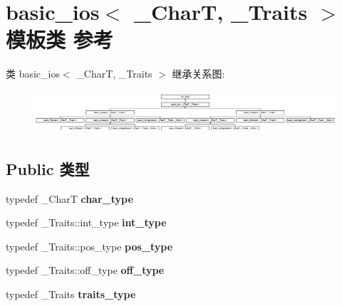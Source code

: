 \hypertarget{classbasic__ios}{}\section{basic\+\_\+ios$<$ \+\_\+\+CharT, \+\_\+\+Traits $>$ 模板类 参考}
\label{classbasic__ios}
类 basic\+\_\+ios$<$ \+\_\+\+CharT, \+\_\+\+Traits $>$ 继承关系图\+:\begin{figure}[H]
\begin{center}
\leavevmode
\includegraphics[height=1.609195cm]{classbasic__ios}
\end{center}
\end{figure}
\subsection*{Public 类型}
\begin{DoxyCompactItemize}
\item 
\mbox{\label{classbasic__ios_a00c2375a3ee154886d040383684bc5f1}} 
typedef \+\_\+\+CharT {\bfseries char\+\_\+type}
\item 
\mbox{\label{classbasic__ios_abfb1eed1ab102dee14f63458b8bdfe9e}} 
typedef \+\_\+\+Traits\+::int\+\_\+type {\bfseries int\+\_\+type}
\item 
\mbox{\label{classbasic__ios_ae1f4ddea88b46888a0ab6c252bbb7251}} 
typedef \+\_\+\+Traits\+::pos\+\_\+type {\bfseries pos\+\_\+type}
\item 
\mbox{\label{classbasic__ios_a990e7fb3bed037d28f69fe4e7efd5fe5}} 
typedef \+\_\+\+Traits\+::off\+\_\+type {\bfseries off\+\_\+type}
\item 
\mbox{\label{classbasic__ios_ac69e610b1621e12166488bd85d01d6c2}} 
typedef \+\_\+\+Traits {\bfseries traits\+\_\+type}
\end{DoxyCompactItemize}
